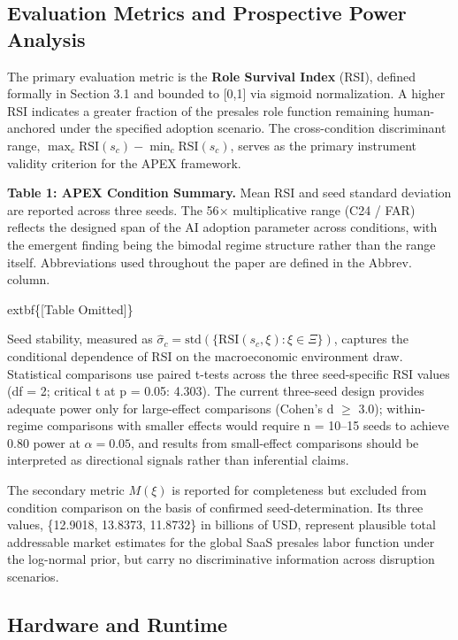 \documentclass[10pt, conference]{IEEEtran}
\begin{document}
\subsection{Evaluation Metrics and Prospective Power Analysis}

\label{sec:evaluation_metrics_and_prospective_power}

The primary evaluation metric is the \textbf{Role Survival Index} (RSI), defined formally in Section 3.1 and bounded to [0,1] via sigmoid normalization. A higher RSI indicates a greater fraction of the presales role function remaining human-anchored under the specified adoption scenario. The cross-condition discriminant range, $\max_c \text{RSI}(s_c) - \min_c \text{RSI}(s_c)$, serves as the primary instrument validity criterion for the APEX framework.

\textbf{Table 1: APEX Condition Summary.} Mean RSI and seed standard deviation are reported across three seeds. The 56$\times$ multiplicative range (C24 / FAR) reflects the designed span of the AI adoption parameter across conditions, with the emergent finding being the bimodal regime structure rather than the range itself. Abbreviations used throughout the paper are defined in the Abbrev. column.

	extbf\{[Table Omitted]\}

Seed stability, measured as $\hat{\sigma}_c = \text{std}(\{\text{RSI}(s_c, \xi) : \xi \in \Xi\})$, captures the conditional dependence of RSI on the macroeconomic environment draw. Statistical comparisons use paired t-tests across the three seed-specific RSI values (df = 2; critical t at p = 0.05: 4.303). The current three-seed design provides adequate power only for large-effect comparisons (Cohen's d $\geq$ 3.0); within-regime comparisons with smaller effects would require n = 10--15 seeds to achieve 0.80 power at $\alpha = 0.05$, and results from small-effect comparisons should be interpreted as directional signals rather than inferential claims.

The secondary metric $M(\xi)$ is reported for completeness but excluded from condition comparison on the basis of confirmed seed-determination. Its three values, \{12.9018, 13.8373, 11.8732\} in billions of USD, represent plausible total addressable market estimates for the global SaaS presales labor function under the log-normal prior, but carry no discriminative information across disruption scenarios.

\subsection{Hardware and Runtime}
\end{document}
